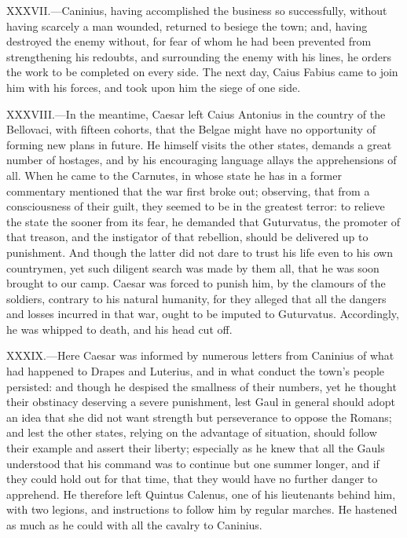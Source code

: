 XXXVII.—Caninius, having accomplished the business so successfully,
without having scarcely a man wounded, returned to besiege the town;
and, having destroyed the enemy without, for fear of whom he had been
prevented from strengthening his redoubts, and surrounding the enemy
with his lines, he orders the work to be completed on every side. The
next day, Caius Fabius came to join him with his forces, and took upon
him the siege of one side.

XXXVIII.—In the meantime, Caesar left Caius Antonius in the country of
the Bellovaci, with fifteen cohorts, that the Belgae might have no
opportunity of forming new plans in future. He himself visits the other
states, demands a great number of hostages, and by his encouraging
language allays the apprehensions of all. When he came to the Carnutes,
in whose state he has in a former commentary mentioned that the war
first broke out; observing, that from a consciousness of their guilt,
they seemed to be in the greatest terror: to relieve the state the
sooner from its fear, he demanded that Guturvatus, the promoter of that
treason, and the instigator of that rebellion, should be delivered up to
punishment. And though the latter did not dare to trust his life even to
his own countrymen, yet such diligent search was made by them all, that
he was soon brought to our camp. Caesar was forced to punish him, by the
clamours of the soldiers, contrary to his natural humanity, for they
alleged that all the dangers and losses incurred in that war, ought to
be imputed to Guturvatus. Accordingly, he was whipped to death, and his
head cut off.

XXXIX.—Here Caesar was informed by numerous letters from Caninius of
what had happened to Drapes and Luterius, and in what conduct the town's
people persisted: and though he despised the smallness of their numbers,
yet he thought their obstinacy deserving a severe punishment, lest Gaul
in general should adopt an idea that she did not want strength but
perseverance to oppose the Romans; and lest the other states, relying on
the advantage of situation, should follow their example and assert their
liberty; especially as he knew that all the Gauls understood that his
command was to continue but one summer longer, and if they could hold
out for that time, that they would have no further danger to apprehend.
He therefore left Quintus Calenus, one of his lieutenants behind him,
with two legions, and instructions to follow him by regular marches. He
hastened as much as he could with all the cavalry to Caninius.

